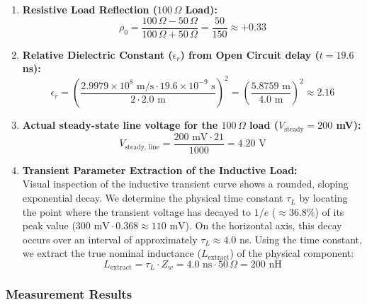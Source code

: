 \begin{enumerate}
    \item \textbf{Resistive Load Reflection ($100\,\Omega$ Load):}
    \begin{equation}
        \rho_0 = \frac{100\,\Omega - 50\,\Omega}{100\,\Omega + 50\,\Omega} = \frac{50}{150} \approx +0.33
    \end{equation}

    \item \textbf{Relative Dielectric Constant ($\epsilon_r$) from Open Circuit delay ($t = 19.6$ ns):}
    \begin{equation}
        \epsilon_r = \left( \frac{2.9979 \times 10^8\text{ m/s} \cdot 19.6 \times 10^{-9}\text{ s}}{2 \cdot 2.0\text{ m}} \right)^2 = \left( \frac{5.8759\text{ m}}{4.0\text{ m}} \right)^2 \approx 2.16
    \end{equation}

    \item \textbf{Actual steady-state line voltage for the $100\,\Omega$ load ($V_{\text{steady}} = 200$ mV):}
    \begin{equation}
        V_{\text{steady, line}} = \frac{200\text{ mV} \cdot 21}{1000} = 4.20\text{ V}
    \end{equation}

    \item \textbf{Transient Parameter Extraction of the Inductive Load:} \\
    Visual inspection of the inductive transient curve shows a rounded, sloping exponential decay. We determine the physical time constant $\tau_L$ by locating the point where the transient voltage has decayed to $1/e$ ($\approx 36.8\%$) of its peak value ($300\text{ mV} \cdot 0.368 \approx 110\text{ mV}$). On the horizontal axis, this decay occurs over an interval of approximately $\tau_L \approx 4.0$ ns. Using the time constant, we extract the true nominal inductance ($L_{\text{extract}}$) of the physical component:
    \begin{equation}
        L_{\text{extract}} = \tau_L \cdot Z_w = 4.0\text{ ns} \cdot 50\,\Omega = 200\text{ nH}
    \end{equation}
\end{enumerate}

\subsubsection{Measurement Results}

